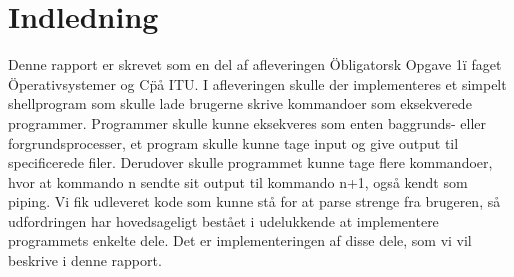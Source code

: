 \section{Indledning}
Denne rapport er skrevet som en del af afleveringen \"Obligatorsk Opgave 1\" i faget \"Operativsystemer og C\" på ITU.
I afleveringen skulle der implementeres et simpelt shellprogram som skulle lade brugerne skrive kommandoer som eksekverede programmer.
Programmer skulle kunne eksekveres som enten baggrunds- eller forgrundsprocesser, et program skulle kunne tage input og give output til specificerede filer. Derudover skulle programmet kunne tage flere kommandoer, hvor at kommando n sendte sit output til kommando n+1, også kendt som piping. Vi fik udleveret kode som kunne stå for at parse strenge fra brugeren, så udfordringen har hovedsageligt bestået i udelukkende at implementere programmets enkelte dele. Det er implementeringen af disse dele, som vi vil beskrive i denne rapport.
